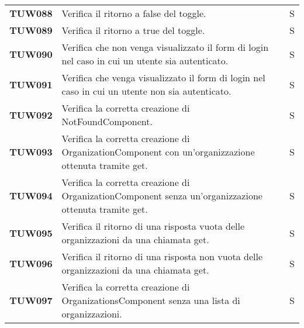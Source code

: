 \documentclass[../../piano-di-qualifica.tex]{subfiles}
\begin{document}
\begin{longtable}[H]{>{\centering\bfseries}m{3cm} >{}m{10cm} >{\centering\arraybackslash}m{3cm}}
  TUW088             & Verifica il ritorno a false del toggle.                                                                             & S                             \\

  TUW089             & Verifica il ritorno a true del toggle.                                                                              & S                             \\

  TUW090             & Verifica che non venga visualizzato il form di login nel caso in cui un utente sia autenticato.                     & S                             \\

  TUW091             & Verifica che  venga visualizzato il form di login nel caso in cui un utente non sia autenticato.                    & S                             \\



  TUW092             & Verifica la corretta creazione di NotFoundComponent.                                                                & S                             \\



  TUW093             & Verifica la corretta creazione di OrganizationComponent con un'organizzazione ottenuta tramite get.                 & S                             \\
  TUW094             & Verifica la corretta creazione di OrganizationComponent senza un'organizzazione ottenuta tramite get.               & S                             \\
  TUW095             & Verifica il ritorno di una risposta vuota delle organizzazioni da una chiamata get.                                 & S                             \\
  TUW096             & Verifica il ritorno di una risposta non vuota delle organizzazioni da una chiamata get.                             & S                             \\


  TUW097             & Verifica la corretta creazione di OrganizationsComponent senza una lista di organizzazioni.                         & S                             \\


\end{longtable}
\end{document}
